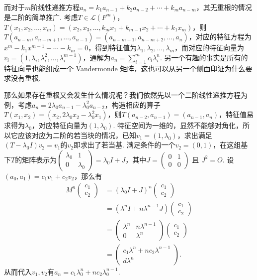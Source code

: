 而对于$m$阶线性递推方程$a_n = k_1 a_{n - 1} + k_2 a_{n - 2} + \cdots + k_m a_{n - m}$，其无重根的情况是二阶的简单推广. 考虑$T \in \mathcal{L}(F^m)$，$T(x_1, x_2, \ldots, x_m) = (x_2, x_3, \ldots, k_m x_1 + k_{m - 1} x_2 + \cdots + k_1 x_m)$，则$T(a_{n - m}, a_{n - m + 1}, \ldots, a_{n - 1}) = (a_{n - m + 1}, a_{n - m + 2}, \ldots, a_n)$，对应的特征方程为$x^m - k_1 x^{m - 1} - \cdots - k_m = 0$，得到特征值为$\lambda_1, \lambda_2, \ldots, \lambda_m$，而对应的特征向量为$v_i = (1, \lambda_i, \lambda_i^2, \ldots, \lambda_i^{m - 1})$，通解为$a_n = \sum_{i = 1}^m c_i \lambda_i^n$. 另一个有趣的事实是所有的特征向量也能组成一个 Vandermonde 矩阵，这也可以从另一个侧面印证为什么要求没有重根.

那么如果存在重根又会发生什么情况呢？我们依然先以一个二阶线性递推方程为例，考虑$a_n = 2 \lambda_0 a_{n - 1} - \lambda_0^2 a_{n - 2}$，构造相应的算子$T(x_1, x_2) = (x_2, 2 \lambda_0 x_2 - \lambda_0^2 x_1)$，则$T(a_{n - 2}, a_{n - 1}) = (a_{n - 1}, a_n)$，特征值易求得为$\lambda_0$，对应特征向量为$(1, \lambda_0)$. 特征空间为一维的，显然不能够对角化，所以它应该对应为二阶的若当块的情况，已知$v_1 = (1, \lambda_0)$，求出满足$(T - \lambda_0 I)v_2 = v_1$的$v_2$即求出了若当基. 满足条件的一个$v_2 = (0, 1)$，在这组基下$T$的矩阵表示为$\begin{pmatrix} \lambda_0 & 1 \\ 0 & \lambda_0 \end{pmatrix} = \lambda_0 I + J$，其中$J = \begin{pmatrix} 0 & 1 \\ 0 & 0 \end{pmatrix}$ 且 $J^2 = O$. 设$(a_0, a_1) = c_1v_1 + c_2v_2$，那么有
\begin{align*}
    M^n \begin{pmatrix} c_1 \\ c_2 \end{pmatrix}
     & = (\lambda_0 I + J)^n \begin{pmatrix} c_1 \\ c_2 \end{pmatrix}                                                          \\
     & = (\lambda^n I + n \lambda^{n - 1} J) \begin{pmatrix} c_1 \\ c_2 \end{pmatrix}                                          \\
     & = \begin{pmatrix} \lambda^n & n \lambda^{n - 1} \\ 0 & \lambda^n \end{pmatrix} \begin{pmatrix} c_1 \\ c_2 \end{pmatrix} \\
     & = \begin{pmatrix} c_1 \lambda^n + n c_2 \lambda^{n - 1} \\ d \lambda^n \end{pmatrix}.
\end{align*}
从而代入$v_1, v_2$有$a_n = c_1 \lambda_0^n + n c_2 \lambda_0^{n - 1}$.

